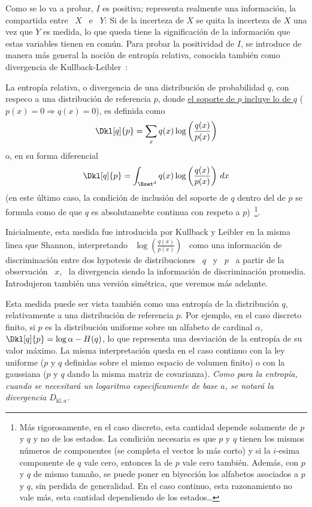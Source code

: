 Como se lo va a probar, $I$ es positiva; representa realmente una informaci\'on,
la compartida  entre \ $X$  \ e  \ $Y$: Si  de la incerteza  de $X$ se  quita la
incerteza  de  $X$   una  vez  que  $Y$  es  medida,  lo   que  queda  tiene  la
significaci\'on de la informaci\'on que  estas variables tienen en com\'un. Para
probar la positividad  de $I$, se introduce de manera  m\'as general la noci\'on
de    entrop\'ia   relativa,    conocida   tambi\'en    como    divergencia   de
Kullback-Leibler~\cite{KulLei51, Kul68, CovTho06, Rio07}:
%
\begin{definicion}\label{def:SZ:entropiarelativa}
  La entrop\'ia  relativa, o divergencia  de una distribuci\'on  de probabilidad
  $q$, con respeco  a una distribuci\'on de referencia  $p$, donde \underline{el
    soporte de  $p$ incluye lo  de $q$}  ($p(x) = 0  \Rightarrow q(x) =  0$), es
  definida como
  \[
  \Dkl[q]{p} = \sum_x q(x) \log \left( \frac{q(x)}{p(x)} \right)
  \]
  o, en su forma diferencial
 \[
 \Dkl[q]{p} = \int_{\Rset^d} q(x) \log \left( \frac{q(x)}{p(x)} \right) \, dx
 \]
 (en este \'ultimo caso, la condici\'on de inclusi\'on del soporte de $q$ dentro
 del de $p$ se  formula como de que $q$ es absolutamebte  continua con respeto a
 $p$)~\footnote{M\'as rigorosamente, en el  caso discreto, esta cantidad depende
   solamente de $p$ y  $q$ y no de los estados. La  condici\'on necesaria es que
   $p$ y $q$  tienen los mismos n\'umeros de componentes  (se completa el vector
   lo m\'as corto) y si la $i$-esima componente de $q$ vale cero, entonces la de
   $p$ vale cero tambi\'en.  Adem\'as, con $p$ y $q$ de mismo tama\~no, se puede
   poner en  biyecci\'on los  alfabetos asociados  a $p$ y  $q$, sin  perdida de
   generalidad.   En el  caso continuo,  esta razonamiento  no vale  m\'as, esta
   cantidad dependiendo de los estados\ldots}.
\end{definicion}
%
Inicialmente, esta  medida fue  introducida por Kullback  y Leibler en  la misma
linea que  Shannon, interpretando \  $\log\left(\frac{q(x)}{p(x)}\right)$ \ como
una informaci\'on  de discriminaci\'on entre  dos hypotesis de  distribuciones \
$q$ \ y \  $p$ \ a partir de la observaci\'on \ $x$,  \ la divergencia siendo la
informaci\'on   de  discriminaci\'on   promedia.   Introdujeron   tambi\'en  una
versi\'on sim\'etrica, que veremos m\'as adelante.

Esta medida puede  ser vista tambi\'en como una  entrop\'ia de la distribuci\'on
$q$, relativamente  a una distribuci\'on de  referencia $p$. Por  ejemplo, en el
caso discreto finito, si $p$ es  la distribuci\'on uniforme sobre un alfabeto de
cardinal  $\alpha$, $\Dkl[q]{p} =  \log \alpha  - H(q)$,  lo que  representa una
desviaci\'on de  la entrop\'ia de  su valor m\'aximo. La  misma interpretaci\'on
queda en  el caso continuo  con la  ley uniforme ($p$  y $q$ definidas  sobre el
mismo espacio de  volumen finito) o con  la gaussiana ($p$ y $q$  dando la misma
matriz de covarianza).  {\it Como para la entrop\'ia,  cuando se necesitar\'a un
  logaritmo   especificamente  de   base   $a$,  se   notar\'a  la   divergencia
  $D_{\mathrm{kl},a}$.}


